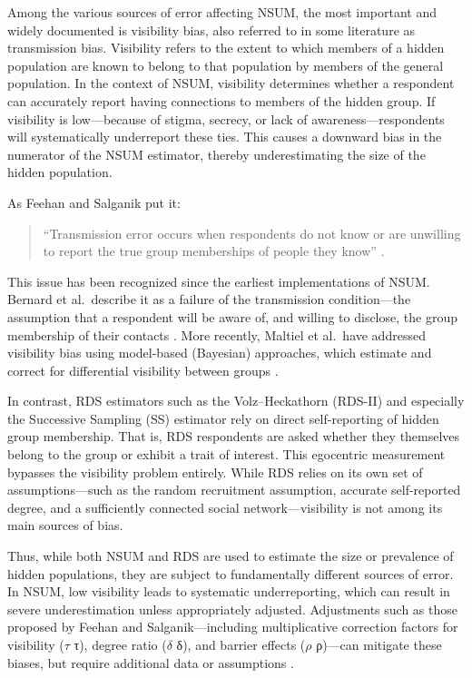 \documentclass[
  12pt,
  letterpaper,
  DIV=11,
  numbers=noendperiod]{scrartcl}
\theoremstyle{plain}
\theoremstyle{definition}
\begin{document}
Among the various sources of error affecting NSUM, the most important
and widely documented is visibility bias, also referred to in some
literature as transmission bias. Visibility refers to the extent to
which members of a hidden population are known to belong to that
population by members of the general population. In the context of NSUM,
visibility determines whether a respondent can accurately report having
connections to members of the hidden group. If visibility is
low---because of stigma, secrecy, or lack of awareness---respondents
will systematically underreport these ties. This causes a downward bias
in the numerator of the NSUM estimator, thereby underestimating the size
of the hidden population.

As Feehan and Salganik put it:

\begin{quote}
``Transmission error occurs when respondents do not know or are
unwilling to report the true group memberships of people they know''
\autocite[155]{feeh16-gener}.
\end{quote}

This issue has been recognized since the earliest implementations of
NSUM. Bernard et al.~describe it as a failure of the transmission
condition---the assumption that a respondent will be aware of, and
willing to disclose, the group membership of their contacts
\autocite{bern10-estima}. More recently, Maltiel et al.~have addressed
visibility bias using model-based (Bayesian) approaches, which estimate
and correct for differential visibility between groups
\autocite{malt15-estima}.

In contrast, RDS estimators such as the Volz--Heckathorn (RDS-II) and
especially the Successive Sampling (SS) estimator rely on direct
self-reporting of hidden group membership. That is, RDS respondents are
asked whether they themselves belong to the group or exhibit a trait of
interest. This egocentric measurement bypasses the visibility problem
entirely. While RDS relies on its own set of assumptions---such as the
random recruitment assumption, accurate self-reported degree, and a
sufficiently connected social network---visibility is not among its main
sources of bias.

Thus, while both NSUM and RDS are used to estimate the size or
prevalence of hidden populations, they are subject to fundamentally
different sources of error. In NSUM, low visibility leads to systematic
underreporting, which can result in severe underestimation unless
appropriately adjusted. Adjustments such as those proposed by Feehan and
Salganik---including multiplicative correction factors for visibility
(\(\tau\) τ), degree ratio (\(\delta\) δ), and barrier effects (\(\rho\)
ρ)---can mitigate these biases, but require additional data or
assumptions \autocite{feeh16-gener}.
\end{document}
